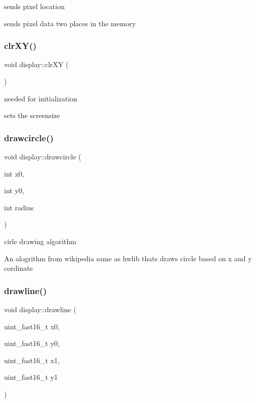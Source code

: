 sends pixel location 

sends pixel data two places in the memory \mbox{\label{classdisplay_ad4f6e4f332f7d296d0917cfeff271507}} 
\subsubsection{\texorpdfstring{clr\+X\+Y()}{clrXY()}}
{\footnotesize\ttfamily void display\+::clr\+XY (\begin{DoxyParamCaption}{ }\end{DoxyParamCaption})}



needed for initialization 

sets the screensize \mbox{\label{classdisplay_aea3fc9645f5b6a097cafd2524b4dd0ee}} 
\subsubsection{\texorpdfstring{drawcircle()}{drawcircle()}}
{\footnotesize\ttfamily void display\+::drawcircle (\begin{DoxyParamCaption}\item[{int}]{x0,  }\item[{int}]{y0,  }\item[{int}]{radius }\end{DoxyParamCaption})}



cirle drawing algorithm 

An alogrithm from wikipedia same as hwlib thats draws circle based on x and y cordinate \mbox{\label{classdisplay_a60e7eb3a85be87ac2867608fd35c9a02}} 
\subsubsection{\texorpdfstring{drawline()}{drawline()}}
{\footnotesize\ttfamily void display\+::drawline (\begin{DoxyParamCaption}\item[{uint\+\_\+fast16\+\_\+t}]{x0,  }\item[{uint\+\_\+fast16\+\_\+t}]{y0,  }\item[{uint\+\_\+fast16\+\_\+t}]{x1,  }\item[{uint\+\_\+fast16\+\_\+t}]{y1 }\end{DoxyParamCaption})}



